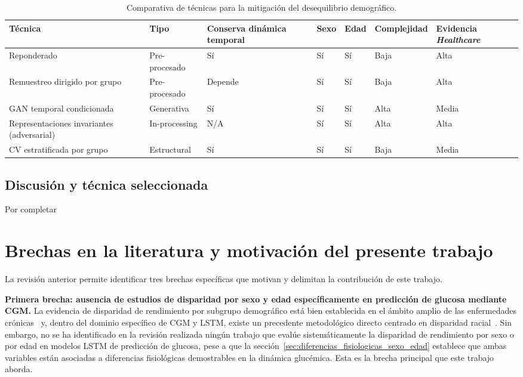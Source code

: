 \begin{table}[htbp]
\centering
\caption{Comparativa de técnicas para la mitigación del desequilibrio demográfico.}
\label{tab:comparativa_balanceo_demografico}
\begin{tabular}{p{2.6cm}p{1.8cm}p{1.6cm}p{1cm}p{1cm}p{1.3cm}p{1.6cm}}
\hline
\textbf{Técnica} & \textbf{Tipo} & \textbf{Conserva din\'amica temporal} & \textbf{Sexo} & \textbf{Edad} & \textbf{Complejidad} & \textbf{Evidencia \emph{Healthcare}} \\
\hline
Reponderado & Pre-procesado & S\'i & S\'i & S\'i & Baja & Alta \\
Remuestreo dirigido por grupo & Pre-procesado & Depende & S\'i & S\'i & Baja & Alta \\
GAN temporal condicionada & Generativa & S\'i & S\'i & S\'i & Alta & Media \\
Representaciones invariantes (adversarial) & In-processing & N/A & S\'i & S\'i & Alta & Alta \\
CV estratificada por grupo & Estructural & S\'i & S\'i & S\'i & Baja & Media \\
\hline
\end{tabular}
\end{table}

\subsection{Discusión y técnica seleccionada}
\label{subsec:discusion_balanceo_demografico}

Por completar

\section{Brechas en la literatura y motivación del presente trabajo}
\label{sec:brechas_motivacion}

La revisión anterior permite identificar tres brechas específicas que motivan y delimitan la contribución de este trabajo.

\textbf{Primera brecha: ausencia de estudios de disparidad por sexo y edad específicamente en predicción de glucosa mediante CGM.} La evidencia de disparidad de rendimiento por subgrupo demográfico está bien establecida en el ámbito amplio de las enfermedades crónicas~\cite{wang2024disparate} y, dentro del dominio específico de CGM y LSTM, existe un precedente metodológico directo centrado en disparidad racial~\cite{ovalle2024racial}. Sin embargo, no se ha identificado en la revisión realizada ningún trabajo que evalúe sistemáticamente la disparidad de rendimiento por sexo o por edad en modelos LSTM de predicción de glucosa, pese a que la sección~\ref{sec:diferencias_fisiologicas_sexo_edad} establece que ambas variables están asociadas a diferencias fisiológicas demostrables en la dinámica glucémica. Esta es la brecha principal que este trabajo aborda.

